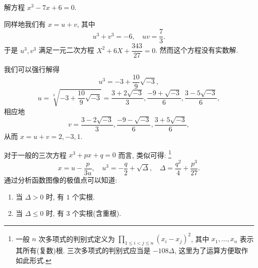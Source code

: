 
\begin{example}
  解方程 $x^3-7x+6=0$.
\end{example}

\begin{solution}
  同样地我们有 $x=u+v$, 其中
    \[u^3+v^3=-6,\quad uv=\frac73.\]
  于是 $u^3,v^3$ 满足一元二次方程 $X^2+6X+\dfrac{343}{27}=0$.
  然而这个方程没有实数解.

  我们可以强行解得
    \[u^3=-3+\frac{10}9\sqrt{-3},\]
    \[u=\sqrt[3]{-3+\frac{10}9\sqrt{-3}}
      =\frac{3+2\sqrt{-3}}3,\frac{-9+\sqrt{-3}}6,\frac{3-5\sqrt{-3}}6,\]
  相应地
    \[v=\frac{3-2\sqrt{-3}}3,\frac{-9-\sqrt{-3}}6,\frac{3+5\sqrt{-3}}6,\]
  从而 $x=u+v=2,-3,1$.
\end{solution}

对于一般的三次方程 $x^3+px+q=0$ 而言, 类似可得:
\footnote{一般 $n$ 次多项式的判别式定义为 $\prod_{1\le i<j\le n}(x_i-x_j)^2$, 其中 $x_1,\dots,x_n$ 表示其所有(复数)根.
三次多项式的判别式应当是 $-108\Delta$, 这里为了运算方便取作如此形式.}
  \[x=u-\frac p{3u},\quad u^3=-\frac q2+\sqrt{\Delta},\quad \Delta=\frac{q^2}4+\frac{p^3}{27}.\]
通过分析函数图像的极值点可以知道:
\begin{enumerate}
  \item 当 $\Delta>0$ 时, 有 $1$ 个实根.
  \item 当 $\Delta\le0$ 时, 有 $3$ 个实根(含重根).
\end{enumerate}

